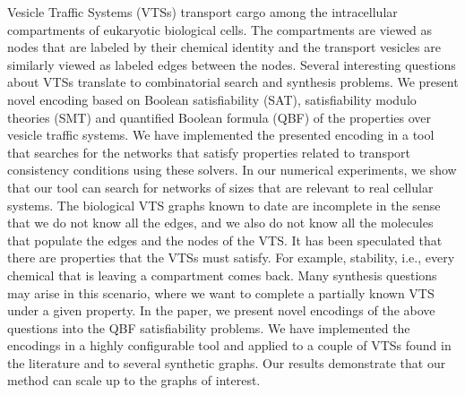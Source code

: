 Vesicle Traffic Systems (VTSs) transport cargo among the intracellular compartments of eukaryotic biological cells.
%
The compartments are viewed as nodes that are labeled by their chemical identity and the transport vesicles are similarly viewed as labeled edges between the nodes.
%
Several interesting questions about VTSs translate to combinatorial search and synthesis problems. 
%
We present novel encoding based on Boolean satisfiability (SAT), satisfiability modulo theories (SMT) and quantified Boolean formula (QBF) of the properties over vesicle traffic systems.
%
We have implemented the presented encoding in a tool that searches for the networks that satisfy properties related to transport consistency conditions using these solvers. 
%
In our numerical experiments, we show that our tool can search for networks of sizes that are relevant to real cellular systems.
%
%
%
The biological VTS graphs known to date are incomplete in the sense that we do not know all the edges, and we also do not know all the molecules that populate the edges and the nodes of the VTS.
%
%
It has been speculated that there are properties that the VTSs must satisfy.
For example, stability, i.e., every chemical that is leaving a compartment
comes back. 
%
Many synthesis questions may arise in this scenario, where we want to complete a partially known VTS under a given property.
%
In the paper, we present novel encodings of the above questions into
the QBF satisfiability problems. 
%
We have implemented the encodings in a highly configurable tool and applied to a couple of VTSs found in the literature and to several synthetic graphs.
%
Our results demonstrate that our method can scale up to the graphs of interest.

